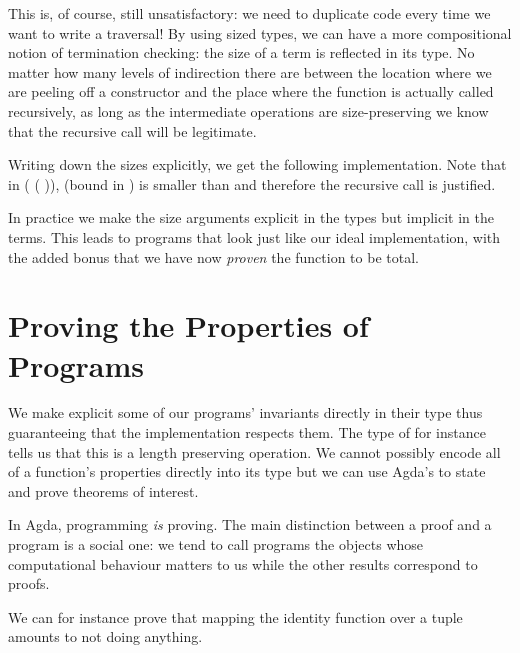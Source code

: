 
This is, of course, still unsatisfactory: we need to duplicate code every
time we want to write a traversal! By using sized types, we can have a more
compositional notion of termination checking: the size of a term is reflected
in its type. No matter how many levels of indirection there are between the
location where we are peeling off a constructor and the place where the function
is actually called recursively, as long as the intermediate operations are
size-preserving we know that the recursive call will be legitimate.

Writing down the sizes explicitly, we get the following implementation. Note
that in ( (  )),
 (bound in ) is smaller than  and therefore the recursive
call is justified.


In practice we make the size arguments explicit in the types but implicit in the
terms. This leads to programs that look just like our ideal implementation, with
the added bonus that we have now \emph{proven} the function to be total.


\section{Proving the Properties of Programs}
\label{sec:intro-proving}
We make explicit some of our programs' invariants directly in their
type thus guaranteeing that the implementation respects them. The
type of  for instance tells us that
this is a length preserving operation. We cannot possibly encode all
of a function's properties directly into its type but we can use
Agda's to state and prove theorems of interest.

In Agda, programming \emph{is} proving. The main distinction between
a proof and a program is a social one: we tend to call programs the
objects whose computational behaviour matters to us while the other
results correspond to proofs.

We can for instance prove that mapping the identity function over a
tuple amounts to not doing anything.

